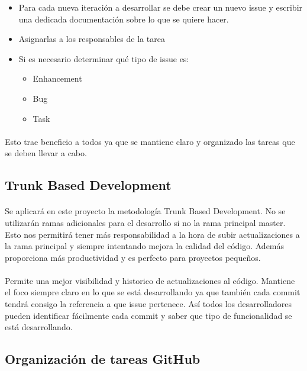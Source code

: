 \begin{itemize}
\item
  Para cada nueva iteración a desarrollar se debe crear un nuevo issue
  y escribir una dedicada documentación sobre lo que se quiere hacer.
\item
  Asignarlas a los responsables de la tarea
\item
  Si es necesario determinar qué tipo de issue es:
  \begin{itemize}
  \item
    Enhancement
  \item
    Bug
  \item
    Task
  \end{itemize}
\end{itemize}

\paragraph{}
Esto trae beneficio a todos ya que se mantiene claro y organizado las
tareas que se deben llevar a cabo.

\subsection{Trunk Based Development}
\paragraph{}
Se aplicará en este proyecto la metodología Trunk Based
Development. No se utilizarán ramas adicionales para el desarrollo si
no la rama principal master. Esto nos permitirá tener más
responsabilidad a la hora de subir actualizaciones a la rama principal
y siempre intentando mejora la calidad del código. Además proporciona
más productividad y es perfecto para proyectos pequeños.

\paragraph{}
Permite una mejor visibilidad y historico de actualizaciones al
código. Mantiene el foco siempre claro en lo que se está desarrollando
ya que también cada commit tendrá consigo la referencia a que issue
pertenece. Así todos los desarrolladores pueden identificar fácilmente
cada commit y saber que tipo de funcionalidad se está desarrollando.

\subsection{Organización de tareas GitHub}
